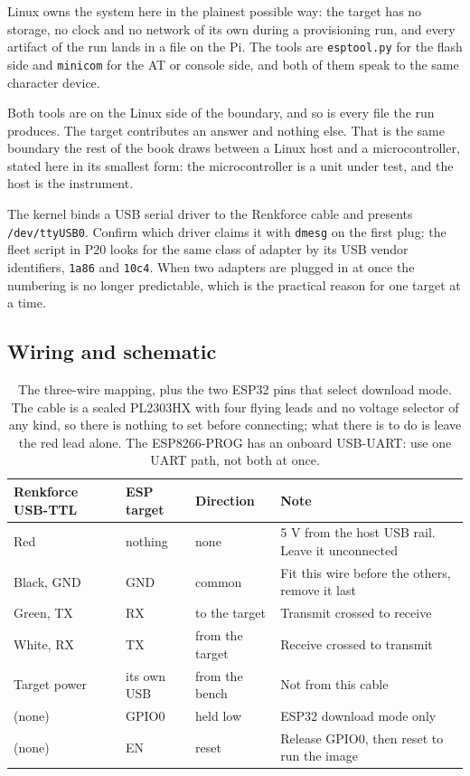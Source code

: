 Linux owns the system here in the plainest possible way: the target has no storage, no clock and no network of its own during a provisioning run, and every artifact of the run lands in a file on the Pi. The tools are \texttt{esptool.py} for the flash side and \texttt{minicom} for the AT or console side, and both of them speak to the same character device.

Both tools are on the Linux side of the boundary, and so is every file the run produces. The target contributes an answer and nothing else. That is the same boundary the rest of the book draws between a Linux host and a microcontroller, stated here in its smallest form: the microcontroller is a unit under test, and the host is the instrument.

The kernel binds a USB serial driver to the Renkforce cable and presents \texttt{/dev/ttyUSB0}. Confirm which driver claims it with \texttt{dmesg} on the first plug: the fleet script in P20 looks for the same class of adapter by its USB vendor identifiers, \texttt{1a86} and \texttt{10c4}. When two adapters are plugged in at once the numbering is no longer predictable, which is the practical reason for one target at a time.

\subsection*{Wiring and schematic}


\begin{table}[H]\centering\small
\begin{tabular}{p{34mm}p{34mm}p{26mm}p{52mm}}
\toprule
Renkforce USB-TTL & ESP target & Direction & Note \\
\midrule
Red & nothing & none & 5 V from the host USB rail. Leave it unconnected \\
Black, GND & GND & common & Fit this wire before the others, remove it last \\
Green, TX & RX & to the target & Transmit crossed to receive \\
White, RX & TX & from the target & Receive crossed to transmit \\
Target power & its own USB & from the bench & Not from this cable \\
(none) & GPIO0 & held low & ESP32 download mode only \\
(none) & EN & reset & Release GPIO0, then reset to run the image \\
\bottomrule
\end{tabular}
\caption{The three-wire mapping, plus the two ESP32 pins that select download mode. The cable is a sealed PL2303HX with four flying leads and no voltage selector of any kind, so there is nothing to set before connecting; what there is to do is leave the red lead alone. The ESP8266-PROG has an onboard USB-UART: use one UART path, not both at once.}
\end{table}

